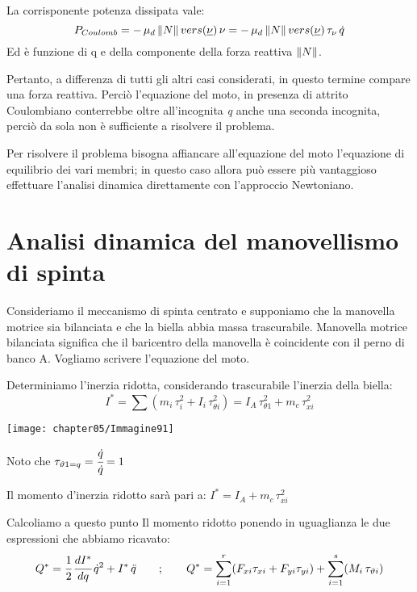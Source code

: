\begin{enumerate}
	La corrisponente potenza dissipata vale:
	\[
	P_{Coulomb} = -\,\mu_d\,\norma{N}\,vers(\und{\nu})\,\nu = -\,\mu_d\,\norma{N}\,vers(\und{\nu})\,\tau_{\nu}\,\dot{q}
	\]
	Ed è funzione di q e della componente della forza reattiva $\norma{N}$.
	
Pertanto, a differenza di tutti gli altri casi considerati, in questo termine compare una forza reattiva. Perciò l'equazione del moto, in presenza di attrito Coulombiano conterrebbe oltre all'incognita \emph{q} anche una seconda incognita, perciò da sola non è sufficiente a risolvere il problema.

Per risolvere il problema bisogna affiancare all'equazione del moto l'equazione di equilibrio dei vari membri; in questo caso allora può essere più vantaggioso effettuare l'analisi dinamica direttamente con l'approccio Newtoniano.
	
	\end{enumerate}
	
	\section{Analisi dinamica del manovellismo di spinta}
	\begin{minipage}{.5\textwidth}
	Consideriamo il meccanismo di spinta centrato e supponiamo che la manovella motrice sia bilanciata e che la biella abbia massa trascurabile. Manovella motrice bilanciata significa che il baricentro della manovella è coincidente con il perno di banco A. Vogliamo scrivere l'equazione del moto.
	
	Determiniamo l'inerzia ridotta, considerando trascurabile l'inerzia della biella:
	\[
	I^* =\sum (m_i\,\tau_i^2 + I_i\,\tau_{\theta i}^2) = I_A\,\tau_{\theta1}^2 + m_c\,\tau_{xi}^2
	\]
	\end{minipage}
	\hfill
	\begin{minipage}{.5\textwidth}
	\centering
	\texttt{[image: chapter05/Immagine91]}
	\end{minipage}
	Noto che $\tau_{\theta1 = q} = \cfrac{\dot{q}}{\dot{q}} = 1$

	Il momento d'inerzia ridotto sarà pari a: $I^* = I_A + m_c\,\tau_{xi}^2$
	
	Calcoliamo a questo punto Il momento ridotto ponendo in uguaglianza le due espressioni che abbiamo ricavato:
	\begin{gather*}
		Q^* = \cfrac{1}{2}\,\td{I^*}{q}\,\dot{q}^2 + I^*\,\ddot{q}\qquad;\qquad 	Q^* = \sum_{i=1}^r(F_{xi}\tau_{xi} + F_{yi}\tau_{yi}) + \sum_{i=1}^s (M_i\,\tau_{\theta i})
	\end{gather*}
	
